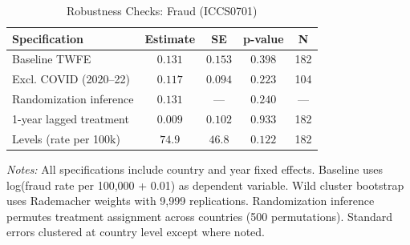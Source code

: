 \begin{table}[t]
\centering
\caption{Robustness Checks: Fraud (ICCS0701)}
\label{tab:robustness}
\begin{tabular}{lcccc}
\hline\hline
Specification & Estimate & SE & p-value & N \\
\hline
Baseline TWFE & $0.131$ & $0.153$ & $0.398$ & 182 \\
Excl. COVID (2020--22) & $0.117$ & $0.094$ & $0.223$ & 104 \\
Randomization inference & $0.131$ & --- & $0.240$ & --- \\
1-year lagged treatment & $0.009$ & $0.102$ & $0.933$ & 182 \\
Levels (rate per 100k) & $74.9$ & $46.8$ & $0.122$ & 182 \\
\hline\hline
\end{tabular}
\begin{tablenotes}
\item \textit{Notes:} All specifications include country and year fixed effects. Baseline uses log(fraud rate per 100,000 + 0.01) as dependent variable. Wild cluster bootstrap uses Rademacher weights with 9,999 replications. Randomization inference permutes treatment assignment across countries (500 permutations). Standard errors clustered at country level except where noted.
\end{tablenotes}
\end{table}
